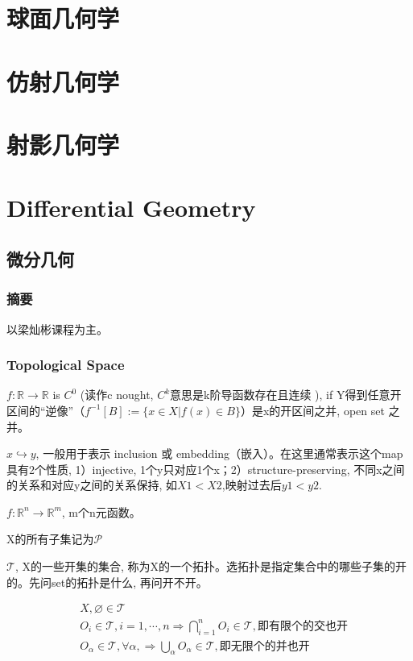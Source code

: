 \documentclass[UTF8]{../09-Mathematics}
\begin{document}
\chapter{球面几何学}


\chapter{仿射几何学}
\chapter{射影几何学}









\chapter{Differential Geometry}
\section{微分几何}
\subsection{摘要}
以梁灿彬课程为主。


\subsection{Topological Space}


$f: \mathbb{R} \to \mathbb{R} $ is $C^0$ (读作c nought, $C^k$意思是k阶导函数存在且连续 ),  if Y得到任意开区间的“逆像”（$f^{-1}[B] := \{x \in X | f(x) \in B\}$）是x的开区间之并, open set 之并。

$x \hookrightarrow y$, 一般用于表示 inclusion 或 embedding（嵌入）。在这里通常表示这个map具有2个性质, 1）injective, 1个y只对应1个x；2）structure-preserving, 不同x之间的关系和对应y之间的关系保持, 如$X1 < X2$,映射过去后$y1 < y2$.

$f: \mathbb{R}^n \to \mathbb{R}^m $,  m个n元函数。

X的所有子集记为$\mathscr P$

$\mathscr T$, X的一些开集的集合, 称为X的一个拓扑。选拓扑是指定集合中的哪些子集的开的。先问set的拓扑是什么, 再问开不开。

\begin{equation}
    \begin{split}
    &X, \varnothing \in \mathscr T\\
    &O_i \in\mathscr T, i=1, \cdots, n \Longrightarrow \bigcap _{i=1}^n O_i  \in\mathscr T, 即有限个的交也开 \\
    &O_\alpha \in\mathscr T, \forall \alpha, \Longrightarrow \bigcup  _\alpha  O_\alpha \in\mathscr T,  即无限个的并也开 \\
    \end{split}
  \end{equation}
\end{document}
